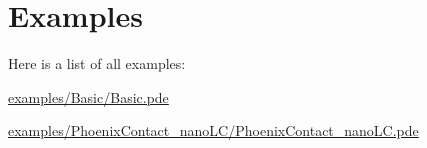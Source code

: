 \section{Examples}
Here is a list of all examples\+:\begin{DoxyCompactItemize}
\item 
\hyperlink{examples_2_basic_2_basic_8pde-example}{examples/\+Basic/\+Basic.\+pde}
\item 
\hyperlink{examples_2_phoenix_contact_nano_l_c_2_phoenix_contact_nano_l_c_8pde-example}{examples/\+Phoenix\+Contact\+\_\+nano\+L\+C/\+Phoenix\+Contact\+\_\+nano\+L\+C.\+pde}
\end{DoxyCompactItemize}
